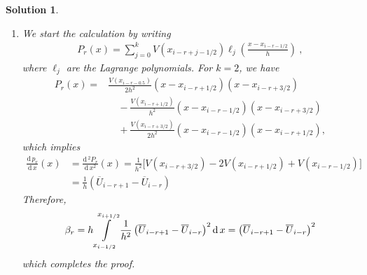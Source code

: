\documentclass[10pt,letterpaper]{article}
\newcommand{\dif}[1][]{\mathrm{d} {#1}\,}
\newcommand{\frb}[1]{ \left(  {#1} \right) }
\theoremstyle{break}
\newtheorem{mysolution}{Solution}
\newenvironment{solution}{\begin{mysolution}}{\end{mysolution}}
\begin{document}
\begin{solution}
\begin{enumerate}

\item
We start the calculation by writing
\begin{gather}
	P_{r}(x)=\sum_{j=0}^{k}V\frb{x_{i-r+j-1/2}} \ell_{j}\frb{\frac{x-x_{i-r-1/2}}{h}}\ ,
\end{gather}
where $\ell_{j}$ are the Lagrange polynomials.
For $k=2$, we have
\begin{align*}
	P_{r}(x)
	=& 
	\frac{ V\frb{x_{i-r-0.5}}}{2h^{2}}
	\left( x-x_{i-r+1/2} \right)
	\left( x-x_{i-r+3/2} \right)
	\\
	&\quad 
	-\frac{ V\left(x_{i-r+1/2}\right) }{ h^{2} }
	\left(x-x_{i-r-1/2}\right)
	\left(x-x_{i-r+3/2}\right)
	\\
	&\quad
	+
	\frac{ V\left(x_{i-r+3/2}\right) }{ 2h^{2} }
	\left( x-x_{i-r-1/2} \right)
	\left( x-x_{i-r+1/2} \right)
	,
\end{align*}
which implies 
\begin{align*}
	\frac{\dif p_{r}}{\dif x}(x) &=\frac{\dif^{2}P_{r}}{\dif x^{2}}(x)
			=\frac{1}{h^{2}}\Big[V\frb{x_{i-r+3/2}}-2V\frb{x_{i-r+1/2}}+V\frb{x_{i-r-1/2}} \Big]\\[0.5em]
		&=\frac{1}{h}\left(\overline{U}_{i-r+1}-\overline{U}_{i-r}\right)
\end{align*}
Therefore,
\begin{align*}
	\beta_{r}=h\intop_{x_{i-1/2}}^{x_{i+1/2}}\frac{1}{h^{2}}\left(\overline{U}_{i-r+1}-\overline{U}_{i-r}\right)^{2}\dif x
		=\left(\overline{U}_{i-r+1}-\overline{U}_{i-r}\right)^{2}
\end{align*}
which completes the proof.



\end{enumerate}
\end{solution}
\end{document}
